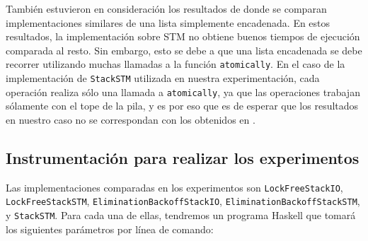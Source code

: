También estuvieron en consideración los resultados de \cite{linked-list} donde se comparan implementaciones similares de una lista simplemente encadenada.
En estos resultados, la implementación sobre STM no obtiene buenos tiempos de ejecución comparada al resto.
Sin embargo, esto se debe a que una lista encadenada se debe recorrer utilizando muchas llamadas a la función \texttt{atomically}.
En el caso de la implementación de \texttt{StackSTM} utilizada en nuestra experimentación, cada operación realiza sólo una llamada a \texttt{atomically}, ya que las operaciones trabajan sólamente con el tope de la pila, y es por eso que es de esperar que los resultados en nuestro caso no se correspondan con los obtenidos en \cite{linked-list}.

\subsection{Instrumentación para realizar los experimentos}\label{subsec:experiment-harness}
Las implementaciones comparadas en los experimentos son \texttt{LockFreeStackIO}, \texttt{LockFreeStackSTM}, \texttt{EliminationBackoffStackIO}, \texttt{EliminationBackoffStackSTM}, y \texttt{StackSTM}. Para cada una de ellas, tendremos un programa Haskell que tomará los siguientes parámetros por línea de comando:

